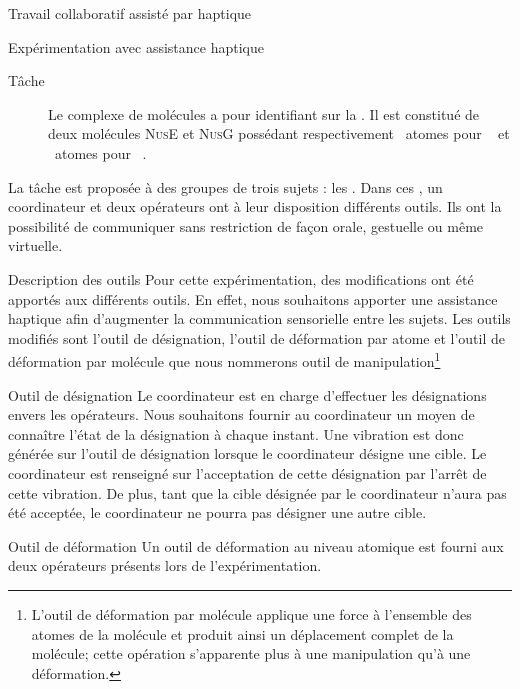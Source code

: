 \documentclass[myfrancais]{mythesis}
\begin{document}
\begin{mychapter}{Travail collaboratif assisté par haptique}
\begin{mysection}{Expérimentation avec assistance haptique}
\begin{mysubsection}{Tâche}
\begin{description}
					\item[\myNusENusG]
						Le complexe de molécules \myNusENusG {} a pour identifiant \myPDB {} sur la \myPDBbase\footnotemark[\value{footnote}].
						Il est constitué de deux molécules \textsc{NusE} et \textsc{NusG} possédant respectivement ~atomes pour ~ et ~atomes pour ~.
				\end{description}

				La tâche est proposée à des groupes de trois sujets : les .
				Dans ces , un \og coordinateur \fg et deux \og opérateurs \fg ont à leur disposition différents outils.
				Ils ont la possibilité de communiquer sans restriction de façon orale, gestuelle ou même virtuelle.
				\begin{mysubsubsection}{Description des outils}
					Pour cette expérimentation, des modifications ont été apportés aux différents outils.
					En effet, nous souhaitons apporter une assistance haptique afin d'augmenter la communication sensorielle entre les sujets.
					Les outils modifiés sont l'outil de désignation, l'outil de déformation par atome et l'outil de déformation par molécule que nous nommerons outil de manipulation\footnote{L'outil de déformation par molécule applique une force à l'ensemble des atomes de la molécule et produit ainsi un déplacement complet de la molécule; cette opération s'apparente plus à une manipulation qu'à une déformation.}
					\begin{myparagraph}{Outil de désignation}
						Le coordinateur est en charge d'effectuer les désignations envers les opérateurs.
						Nous souhaitons fournir au coordinateur un moyen de connaître l'état de la désignation à chaque instant.
						Une vibration est donc générée sur l'outil de désignation lorsque le coordinateur désigne une cible.
						Le coordinateur est renseigné sur l'acceptation de cette désignation par l'arrêt de cette vibration.
						De plus, tant que la cible désignée par le coordinateur n'aura pas été acceptée, le coordinateur ne pourra pas désigner une autre cible.
					\end{myparagraph}
					\begin{myparagraph}{Outil de déformation}
						Un outil de déformation au niveau atomique est fourni aux deux opérateurs présents lors de l'expérimentation.

\end{myparagraph}
\end{mysubsubsection}
\end{mysubsection}
\end{mysection}
\end{mychapter}
\end{document}
